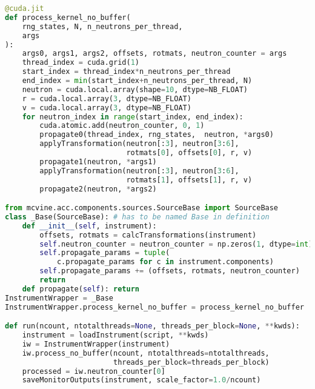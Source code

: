 \begin{lstlisting}[language=python]
@cuda.jit
def process_kernel_no_buffer(
    rng_states, N, n_neutrons_per_thread,
    args
):
    args0, args1, args2, offsets, rotmats, neutron_counter = args
    thread_index = cuda.grid(1)
    start_index = thread_index*n_neutrons_per_thread
    end_index = min(start_index+n_neutrons_per_thread, N)
    neutron = cuda.local.array(shape=10, dtype=NB_FLOAT)
    r = cuda.local.array(3, dtype=NB_FLOAT)
    v = cuda.local.array(3, dtype=NB_FLOAT)
    for neutron_index in range(start_index, end_index):
        cuda.atomic.add(neutron_counter, 0, 1)
        propagate0(thread_index, rng_states,  neutron, *args0)
        applyTransformation(neutron[:3], neutron[3:6],
                            rotmats[0], offsets[0], r, v)
        propagate1(neutron, *args1)
        applyTransformation(neutron[:3], neutron[3:6],
                            rotmats[1], offsets[1], r, v)
        propagate2(neutron, *args2)

from mcvine.acc.components.sources.SourceBase import SourceBase
class _Base(SourceBase): # has to be named Base in definition
    def __init__(self, instrument):
        offsets, rotmats = calcTransformations(instrument)
        self.neutron_counter = neutron_counter = np.zeros(1, dtype=int)
        self.propagate_params = tuple(
            c.propagate_params for c in instrument.components)
        self.propagate_params += (offsets, rotmats, neutron_counter)
        return
    def propagate(self): return
InstrumentWrapper = _Base
InstrumentWrapper.process_kernel_no_buffer = process_kernel_no_buffer

def run(ncount, ntotalthreads=None, threads_per_block=None, **kwds):
    instrument = loadInstrument(script, **kwds)
    iw = InstrumentWrapper(instrument)
    iw.process_no_buffer(ncount, ntotalthreads=ntotalthreads,
                         threads_per_block=threads_per_block)
    processed = iw.neutron_counter[0]
    saveMonitorOutputs(instrument, scale_factor=1.0/ncount)
\end{lstlisting}
